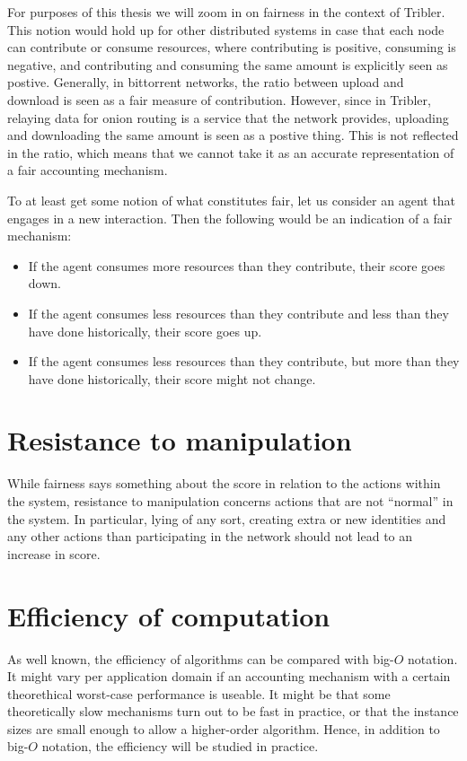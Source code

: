 \documentclass[a4paper,11pt]{book}
\theoremstyle{definition}
\begin{document}
For purposes of this thesis we will zoom in on fairness in the context of Tribler.
This notion would hold up for other distributed systems in case that each node
can contribute or consume resources, where contributing is positive, consuming
is negative, and contributing and consuming the same amount is explicitly seen as postive.
Generally, in bittorrent networks, the ratio between upload and download is seen
as a fair measure of contribution. However, since in Tribler, relaying data for onion
routing is a service that the network provides, uploading and downloading the same
amount is seen as a postive thing. This is not reflected in the ratio, which
means that we cannot take it as an accurate representation of a fair accounting mechanism.

To at least get some notion of what constitutes fair, let us consider an agent that
engages in a new interaction. Then the following would be an indication of a fair mechanism:

\begin{itemize}
    \item If the agent consumes more resources than they contribute, their score goes down.
    \item If the agent consumes less resources than they contribute and less than they have
        done historically, their score goes up.
     \item If the agent consumes less resources than they contribute, but more than they have
        done historically, their score might not change.
\end{itemize}

\section{Resistance to manipulation}

While fairness says something about the score in relation to the actions within
the system, resistance to manipulation concerns actions that are not ``normal''
in the system. In particular, lying of any sort, creating extra or new identities
and any other actions than participating in the network should not lead to an
increase in score.

\section{Efficiency of computation}

As well known, the efficiency of algorithms can be compared with big-$O$ notation.
It might vary per application domain if an accounting mechanism with a certain
theorethical worst-case performance is useable. It might be that some
theoretically slow mechanisms turn out to be fast in practice, or that the
instance sizes are small enough to allow a higher-order algorithm. Hence,
in addition to big-$O$ notation, the efficiency will be studied in practice.
\end{document}

